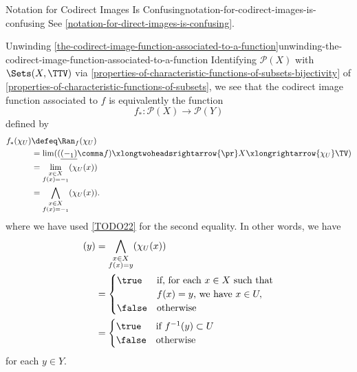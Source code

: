 \begin{warning}{Notation for Codirect Images Is Confusing}{notation-for-codirect-images-is-confusing}%
    See \cref{notation-for-direct-images-is-confusing}.
\end{warning}
\begin{remark}{Unwinding \cref{the-codirect-image-function-associated-to-a-function}}{unwinding-the-codirect-image-function-associated-to-a-function}%
    Identifying $\mathcal{P}(X)$ with $\Sets(X,\TTV)$ via \cref{properties-of-characteristic-functions-of-subsets-bijectivity} of \cref{properties-of-characteristic-functions-of-subsets}, we see that the codirect image function associated to $f$ is equivalently the function
    \[
        f_{*}%
        \colon%
        \mathcal{P}(X)%
        \to%
        \mathcal{P}(Y)%
    \]%
    defined by
    \begin{align*}
        f_{*}(\chi_{U}) &\defeq \Ran_{f}(\chi_{U})\\%
                        &=      \lim((\underline{(-_{1})}\comma f)\xlongtwoheadsrightarrow{\pr}X\xlongrightarrow{\chi_{U}}\TV)\\%
                        &=      \lim_{\substack{x\in X\\f(x)=-_{1}}}(\chi_{U}(x))\\%
                        &=      \bigwedge_{\substack{x\in X\\f(x)=-_{1}}}(\chi_{U}(x)).%
    \end{align*}
    where we have used \cref{TODO22} for the second equality. In other words, we have
    \begin{align*}
        [f_{*}(\chi_{U})](y) &= \bigwedge_{\substack{x\in X\\f(x)=y}}(\chi_{U}(x))\\%
                             &= \begin{cases}
                                    \true  &\text{if, for each $x\in X$ such that}\\
                                           &\text{$f(x)=y$, we have $x\in U,$}\\
                                    \false &\text{otherwise}
                                \end{cases}\\
                             &= \begin{cases}
                                    \true  &\text{if $f^{-1}(y)\subset U$}\\
                                    \false &\text{otherwise}
                                \end{cases}
    \end{align*}
    for each $y\in Y$.
\end{remark}

